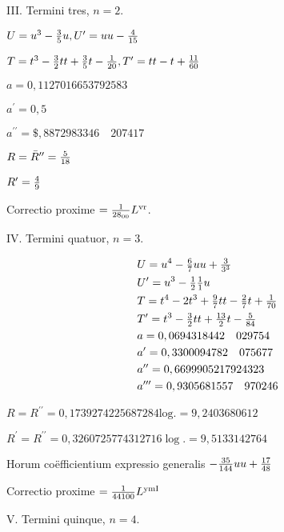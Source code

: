 \documentclass[twoside,12pt, showframe]{memoir}
\let\oldfrac\frac
\def\frac#1#2{\mathchoice{\tfrac{#1}{#2}}{\oldfrac{#1}{#2}}{\genfrac{}{}{}{2}{#1}{#2\mathstrut}}{\genfrac{}{}{}{3}{#1}{#2\mathstrut}}}
\begin{document}
III. Termini tres, \(n=2\).

\(U=u^{3}-\frac{3}{5} u, U^{\prime}=u u-\frac{4}{15}\)

\(T=t^{3}-\frac{3}{2} t t+\frac{3}{5} t-\frac{1}{20}, T^{\prime}=t t-t+\frac{11}{60}\)

\(a=0,1127016653792583\)

\(a^{\prime}=0,5\)

\(a^{\prime \prime}=\$, 8872983346 \quad 207417\)

\(R=\bar{R}^{\prime \prime}=\frac{5}{18}\)

\(R^{\prime}=\frac{4}{9}\)

Correctio proxime \(=\frac{1}{28_{00}} L^{\mathrm{vr}}\).

IV. Termini quatuor, \(n=3\).

\[
\begin{aligned}
& U=u^{4}-\frac{6}{7} u u+\frac{3}{3^{3}} \\
& U^{\prime}=u^{3}-\frac{1}{2} \frac{1}{1} u \\
& T=t^{4}-2 t^{3}+\frac{9}{7} t t-\frac{2}{7} t+\frac{1}{70} \\
& T^{\prime}=t^{3}-\frac{3}{2} t t+\frac{13}{2} t-\frac{5}{84} \\
& a=0,0694318442 \quad 029754 \\
& a^{\prime}=0,3300094782 \quad 075677 \\
& a^{\prime \prime}=0,6699905217924323 \\
& a^{\prime \prime \prime}=0,9305681557 \quad 970246
\end{aligned}
\]

\(R=R^{\prime \prime}=0,1739274225687284 \mathrm{log} .=9,2403680612\)

\(R^{\prime}=R^{\prime \prime}=0,3260725774312716 \log .=9,5133142764\)

Horum coëfficientium expressio generalis \(-\frac{35}{144} u u+\frac{17}{48}\)

Correctio proxime \(=\frac{1}{44100} L^{\mathrm{ymI}}\)

V. Termini quinque, \(n=4\).
\end{document}
